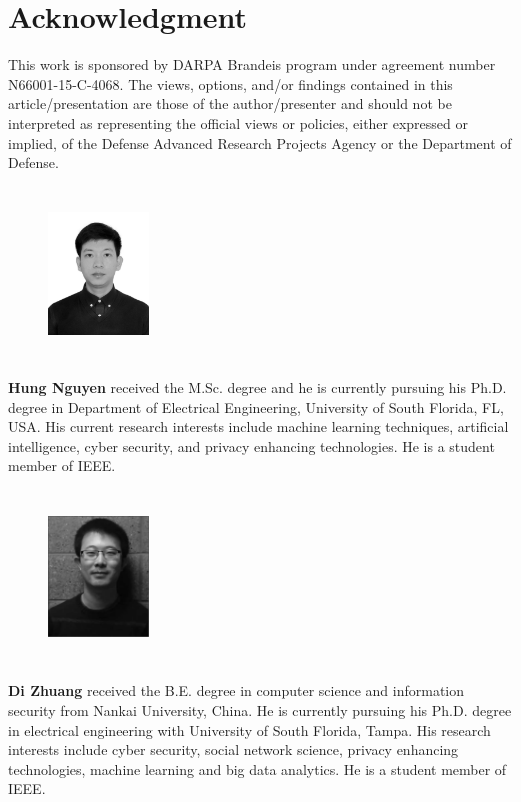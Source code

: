 \documentclass[final,5p,twocolumn]{elsarticle}
\begin{document}
	\section*{Acknowledgment}
	This work is sponsored by DARPA Brandeis program under agreement number N66001-15-C-4068. The views, options, and/or findings contained in this article/presentation are those of the author/presenter and should not be interpreted as representing the official views or policies, either expressed or implied, of the Defense Advanced Research Projects Agency or the Department of Defense.  
	
	
	
	
	\balance 
	\begin{figure} 		\includegraphics[width=1.05in,height=1.8in,clip,keepaspectratio]{biography/hung_}
	\end{figure}\par
	\textbf{Hung Nguyen} received the M.Sc. degree and he is currently pursuing his Ph.D. degree in Department of Electrical Engineering, University of South Florida, FL, USA. His current research interests include machine learning techniques, artificial intelligence, cyber security, and privacy enhancing technologies. He is a student member of IEEE.\par 
	
	\begin{figure} 
		\includegraphics[width=1.05in,height=1.8in,clip,keepaspectratio]{biography/Zhuang_CP}
	\end{figure}\par
	\textbf{Di Zhuang} received the B.E. degree in computer science and information security from Nankai University, China. He is currently pursuing his Ph.D. degree in electrical engineering with University of South Florida, Tampa. His research interests include cyber security, social network science, privacy enhancing technologies, machine learning and big data analytics. He is a student member of IEEE.\\ \par
	
\end{document}

